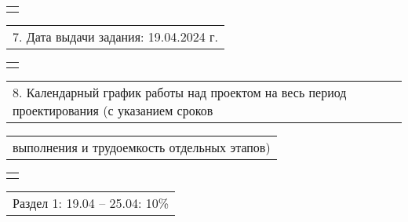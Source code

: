 \documentclass[12pt, А4, twoside]{article}
\begin{document}
\begin{FlushLeft}
    \begin{tabular}{p{17.25cm}}
        \vspace{0pt} \hline \\
    \end{tabular}

    \vspace{-0.1 cm}

    \begin{tabular}{p{17.25cm}}
        \textsf{7. Дата выдачи задания: 19.04.2024 г.} \vspace{0pt} \hline \\
    \end{tabular}

    \begin{tabular}{p{17.25cm}}
        \vspace{0pt} \hline \\
    \end{tabular}

    \vspace{-0.1 cm}

    \begin{tabular}{p{17.25cm}}
        \textsf{8. Календарный график работы над проектом на весь период проектирования (с указанием сроков} \vspace{0pt} \hline \\
    \end{tabular}

    \vspace{-0.1 cm}

    \begin{tabular}{p{17.25cm}}
        \textsf{выполнения и трудоемкость отдельных этапов)} \vspace{0pt} \hline \\
    \end{tabular}

    \begin{tabular}{p{17.25cm}}
        \vspace{0pt} \hline \\
    \end{tabular}

    \vspace{-0.1 cm}

    \begin{tabular}{p{17.25cm}}
        \hspace{0.3cm} \textsf{Раздел 1:} \hspace{2.54cm} \textsf{ 19.04 {--} 25.04:} \hspace{0.5cm} \textsf{10\%} \vspace{0pt} \hline \\
    \end{tabular}


\end{FlushLeft}
\end{document}
